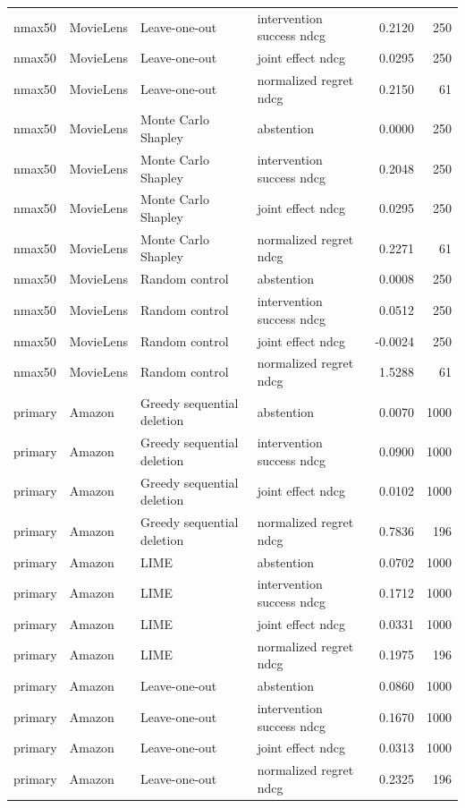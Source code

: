 \begin{longtable}{@{}p{}p{}p{}p{}rr@{}}
nmax50 & MovieLens & Leave-one-out & intervention success ndcg & 0.2120 & 250 \\
nmax50 & MovieLens & Leave-one-out & joint effect ndcg & 0.0295 & 250 \\
nmax50 & MovieLens & Leave-one-out & normalized regret ndcg & 0.2150 & 61 \\
nmax50 & MovieLens & Monte Carlo Shapley & abstention & 0.0000 & 250 \\
nmax50 & MovieLens & Monte Carlo Shapley & intervention success ndcg & 0.2048 & 250 \\
nmax50 & MovieLens & Monte Carlo Shapley & joint effect ndcg & 0.0295 & 250 \\
nmax50 & MovieLens & Monte Carlo Shapley & normalized regret ndcg & 0.2271 & 61 \\
nmax50 & MovieLens & Random control & abstention & 0.0008 & 250 \\
nmax50 & MovieLens & Random control & intervention success ndcg & 0.0512 & 250 \\
nmax50 & MovieLens & Random control & joint effect ndcg & -0.0024 & 250 \\
nmax50 & MovieLens & Random control & normalized regret ndcg & 1.5288 & 61 \\
primary & Amazon & Greedy sequential deletion & abstention & 0.0070 & 1000 \\
primary & Amazon & Greedy sequential deletion & intervention success ndcg & 0.0900 & 1000 \\
primary & Amazon & Greedy sequential deletion & joint effect ndcg & 0.0102 & 1000 \\
primary & Amazon & Greedy sequential deletion & normalized regret ndcg & 0.7836 & 196 \\
primary & Amazon & LIME & abstention & 0.0702 & 1000 \\
primary & Amazon & LIME & intervention success ndcg & 0.1712 & 1000 \\
primary & Amazon & LIME & joint effect ndcg & 0.0331 & 1000 \\
primary & Amazon & LIME & normalized regret ndcg & 0.1975 & 196 \\
primary & Amazon & Leave-one-out & abstention & 0.0860 & 1000 \\
primary & Amazon & Leave-one-out & intervention success ndcg & 0.1670 & 1000 \\
primary & Amazon & Leave-one-out & joint effect ndcg & 0.0313 & 1000 \\
primary & Amazon & Leave-one-out & normalized regret ndcg & 0.2325 & 196 \\

\end{longtable}
